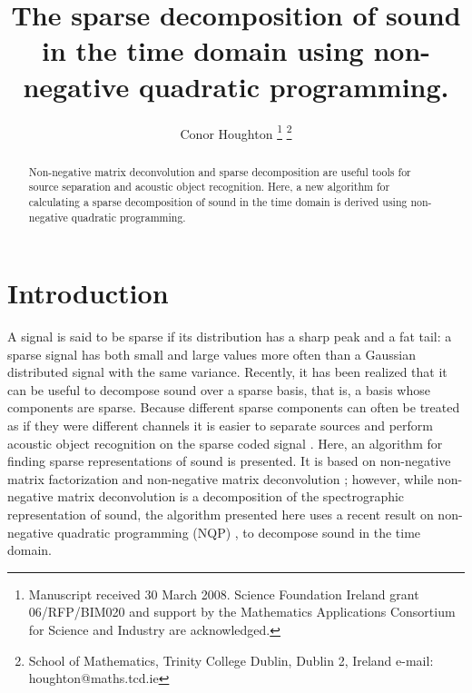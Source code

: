 \documentclass[11pt,twocolumn]{IEEEtran}
\begin{document}
\newcommand{\ui}{{\bar{i}}}
\newcommand{\uj}{{\bar{j}}}
\newcommand{\uk}{{\bar{k}}}
\newcommand{\ul}{{\bar{l}}}
\newcommand{\um}{{\bar{m}}}
\newcommand{\uI}{{\bar{I}}}
\newcommand{\uJ}{{\bar{J}}}

\def\deltabf{\mbox{\boldmath $\delta$}}
\def\mubf{\mbox{\boldmath $\mu$}}
\def\nubf{\mbox{\boldmath $\nu$}}



\title{The sparse decomposition of sound in the time domain using non-negative quadratic programming.}
%
%
%

\author{{Conor Houghton}%
\thanks{Manuscript received 30 March
  2008. Science Foundation Ireland grant 06/RFP/BIM020 and support
  by the Mathematics Applications Consortium for Science and
  Industry are acknowledged.}%
\thanks{School of Mathematics, Trinity
College Dublin, Dublin 2, Ireland e-mail: houghton@maths.tcd.ie}%
}

\maketitle

\begin{abstract}
Non-negative matrix deconvolution and sparse decomposition are useful
tools for source separation and acoustic object recognition. Here, a
new algorithm for calculating a sparse decomposition of sound in the
time domain is derived using non-negative quadratic programming.
\end{abstract}


\section{Introduction}

A signal is said to be sparse if its distribution has a sharp peak and
a fat tail: a sparse signal has both small and large values more often than a
Gaussian distributed signal with the same variance. Recently, it has
been realized that it can be useful to decompose sound over a
sparse basis, that is, a basis whose components are sparse. Because different
sparse components can often be treated as if they were different
channels it is easier to separate sources and perform acoustic object
recognition on the sparse coded signal
\cite{OGradyPearlmutterRickard2005a,AbdallahPlumbley2006a,AsariPearlmutterZador2006a,AsariEtAl2007a,JafariEtAl2006a}. Here,
an algorithm for finding sparse representations of sound is presented.
It is based on non-negative matrix factorization and non-negative
matrix deconvolution \cite{LeeSeung1999a,Smaragdis2004a}; however,
while non-negative matrix deconvolution is a decomposition of the
spectrographic representation of sound, the algorithm presented here
uses a recent result on non-negative quadratic programming (NQP)
\cite{ShaEtAl2003a,ShaEtAl2003b,ShaEtAl2007a}, to decompose sound in
the time domain.
\end{document}
